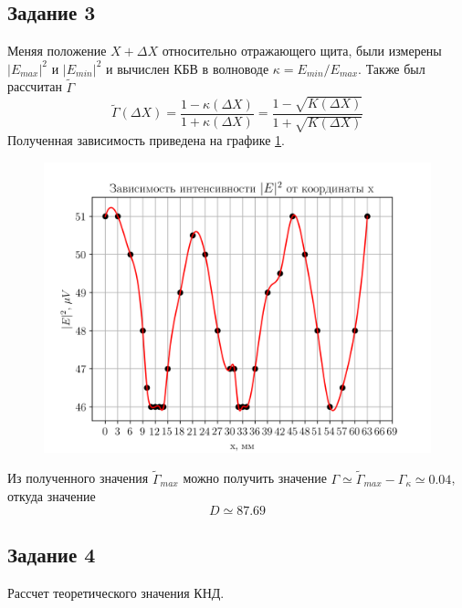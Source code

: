 \subsection{Задание 3}
Меняя положение $X +\Delta X$ относительно отражающего щита, были измерены $|E_{max}|^2$ и $|E_{min}|^2$ и вычислен
КБВ в волноводе $\kappa = E_{min} / E_{max}$. Также был рассчитан $\tilde{\Gamma} $
\begin{equation}
    \tilde{\Gamma}(\Delta X)= \frac{1-\kappa (\Delta X)}{1+\kappa (\Delta X)} = \frac{1-\sqrt{K(\Delta X)}}{1+\sqrt{K(\Delta X)}} 
\end{equation}
Полученная зависимость приведена на графике \ref{fig:exp:3}.
\begin{figure}[h!]
    \centering
    \includegraphics[width = 0.9\linewidth]{graphs/data1.png}
    \label{fig:exp:3}
    \caption{}
\end{figure}

Из полученного значения $\tilde{\Gamma}_{max}$ можно получить значение $\Gamma \simeq \tilde{\Gamma}_{max} -
\Gamma_{\kappa} \simeq 0.04$, откуда значение $$D \simeq 87.69$$ 

\subsection{Задание 4}
Рассчет теоретического значения КНД.
 
